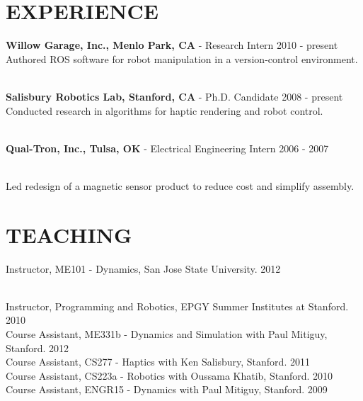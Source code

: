 \documentclass[line,margin]{res}
\newcommand{\CVOnly}[1]{}
\newcommand{\CVOnly}[1]{#1}
\begin{document}
\begin{resume}
\section{EXPERIENCE} 
\vspace{1.0pc}
{\bf Willow Garage, Inc., Menlo Park, CA } - Research Intern \hfill 2010 - present
\\[0.0pc]Authored ROS software for robot manipulation in a version-control environment. 
\CVOnly{\\[0.0pc]Created systems and user interfaces for teleoperated mobile manipulation.}
%
\\[0.4pc]{\bf Salisbury Robotics Lab, Stanford, CA } - Ph.D. Candidate \hfill 2008 - present
\\[0.0pc]Conducted research in algorithms for haptic rendering and robot control.
\CVOnly{\\[0.0pc]Implemented miniature stereo camera sensor hardware for a robot gripper.}
%
\\[0.4pc]{\bf Qual-Tron, Inc., Tulsa, OK} - Electrical Engineering Intern \hfill 2006 - 2007
\CVOnly{\\[0.0pc] Designed and implemented test procedures for IR and magnetic sensor products. }
\\[0.0pc]Led redesign of a magnetic sensor product to reduce cost and simplify assembly.
%
%
\section{TEACHING} 
\vspace{1.0pc}
Instructor, ME101 - Dynamics, San Jose State University\CVOnly{, 49 students}. \hfill {} \CVOnly{Fall }2012%
\CVOnly{\\[0.0pc]Instructor, ME101 - Dynamics, San Jose State University, 56 students. \hfill Fall 2011}
\\[0.0pc] Instructor, Programming and Robotics, EPGY Summer Institutes at Stanford. \hfill \CVOnly{Summer} 
2010
\\[0.4pc] Course Assistant, ME331b - Dynamics and Simulation with Paul Mitiguy, Stanford. \hfill \CVOnly{Spring} 2012
\\[0.0pc] Course Assistant, CS277 - Haptics with Ken Salisbury, Stanford. \hfill \CVOnly{Winter}
2011
\\[0.0pc] Course Assistant, CS223a - Robotics with Oussama Khatib, Stanford. \hfill \CVOnly{Winter} 
2010 
\\[0.0pc] Course Assistant, ENGR15 - Dynamics with Paul Mitiguy, Stanford. \hfill \CVOnly{Fall}
2009 


\end{resume}
\end{document}
